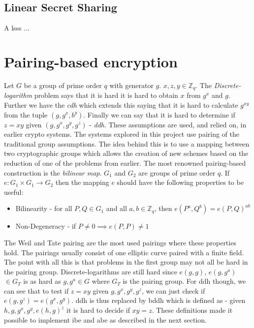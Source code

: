 \subsection{Linear Secret Sharing}\label{subsec:lsss}
A \gls{lsss} ... 

\section{Pairing-based encryption}
Let $G$ be a group of prime order $q$ with generator $g$. $x,z,y \in \mathbb{Z}_q$. The \emph{Discrete-logarithm} problem says that it is hard it is hard to obtain $x$ from $g^x$ and $g$. Further we have the \emph{\gls{cdh}} which extends this saying that it is hard to calculate $g^{xy}$ from the tuple $(g, g^x, b^y)$. Finally we can say that it is hard to determine if $z=xy$ given $(g, g^x, g^y, g^z)$ - \emph{\gls{ddh}}. These assumptions are used, and relied on, in earlier crypto systems. The systems explored in this project use pairing of the traditional group assumptions. The idea behind this is to use a mapping between two cryptographic groups which allows the creation of new schemes based on the reduction of one of the problems from earlier. The most renowned pairing-based construction is the \emph{bilinear map}. $G_1$ and $G_2$ are groups of prime order $q$. If $e: G_1 \times G_1 \rightarrow G_2$ then the mapping $e$ should have the following properties to be useful: 
\begin{itemize}
\item Bilinearity - for all $P, Q \in G_1$ and all $a,b \in \mathbb{Z}_q$, then $e(P^a, Q^b) = e(P, Q)^{ab}$
\item Non-Degeneracy - if $P \neq 0 \implies e(P,P) \neq 1$
\end{itemize}
The Weil and Tate pairing are the most used pairings where these properties hold. The pairings usually consist of one elliptic curve paired with a finite field. 
The point with all this is that problems in the first group may not all be hard in the pairing group. Discrete-logarithms are still hard since $e(g,g)$, $e(g,g^a)$ $\in G_T$ is as hard as $g,g^a \in G$ where $G_T$ is the pairing group.
For \gls{ddh} though, we can see that to test if $z=xy$ given $g, g^x, g^y, g^z$, we can just check if $e(g, g^z) = e(g^x, g^y)$. \Gls{ddh} is thus replaced by \gls{bddh} which is defined as - given $h, g, g^x, g^y, e(h,g)^z$ it is hard to decide if $xy = z$. \cite{pairing-survey} These definitions made it possible to implement \gls{ibe} and \gls{abe} as described in the next section.

